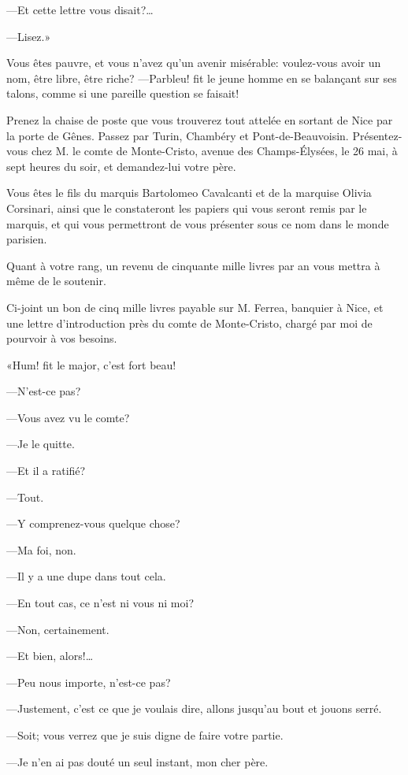 —Et cette lettre vous disait?\dots 

—Lisez.» 

\begin{mail}{}{}
Vous êtes pauvre, et vous n'avez qu'un avenir misérable: voulez-vous avoir un nom, être libre, être riche?
\pausemail
—Parbleu! fit le jeune homme en se balançant sur ses talons, comme si une pareille question se faisait! 
\resumemail

Prenez la chaise de poste que vous trouverez tout attelée en sortant de Nice par la porte de Gênes. Passez par Turin, Chambéry et Pont-de-Beauvoisin. Présentez-vous chez M. le comte de Monte-Cristo, avenue des Champs-Élysées, le 26 mai, à sept heures du soir, et demandez-lui votre père. 

Vous êtes le fils du marquis Bartolomeo Cavalcanti et de la marquise Olivia Corsinari, ainsi que le constateront les papiers qui vous seront remis par le marquis, et qui vous permettront de vous présenter sous ce nom dans le monde parisien. 

Quant à votre rang, un revenu de cinquante mille livres par an vous mettra à même de le soutenir. 

Ci-joint un bon de cinq mille livres payable sur M. Ferrea, banquier à Nice, et une lettre d'introduction près du comte de Monte-Cristo, chargé par moi de pourvoir à vos besoins. 
\end{mail}

«Hum! fit le major, c'est fort beau! 

—N'est-ce pas? 

—Vous avez vu le comte? 

—Je le quitte. 

—Et il a ratifié? 

—Tout. 

—Y comprenez-vous quelque chose? 

—Ma foi, non. 

—Il y a une dupe dans tout cela. 

—En tout cas, ce n'est ni vous ni moi? 

—Non, certainement. 

—Et bien, alors!\dots 

—Peu nous importe, n'est-ce pas?  

—Justement, c'est ce que je voulais dire, allons jusqu'au bout et jouons serré. 

—Soit; vous verrez que je suis digne de faire votre partie. 

—Je n'en ai pas douté un seul instant, mon cher père. 

